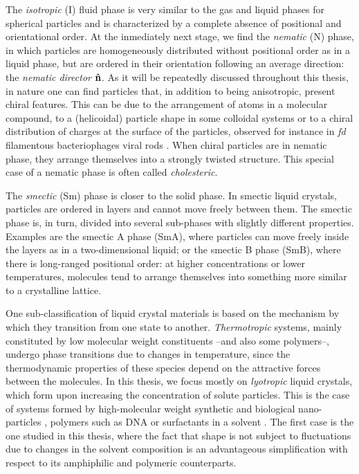 The {\em isotropic} (I) fluid phase is very similar to the gas and liquid phases for spherical particles and is characterized by a complete absence of positional and orientational order. At the inmediately next stage, we find the {\em nematic} (N) phase, in which particles are homogeneously distributed without positional order as in a liquid phase, but are ordered in their orientation following an average direction: the {\em nematic director} ${\bf \hat{n}}$. As it will be repeatedly discussed throughout this thesis, in nature one can find particles that, in addition to being anisotropic, present chiral features. This can be due to the arrangement of atoms in a molecular compound, to a (helicoidal) particle shape in some colloidal systems or to a chiral distribution of charges at the surface of the particles, observed for instance in {\em fd} filamentous bacteriophages viral rods \cite{Gibaud_2017}. When chiral particles are in nematic phase, they arrange themselves into a strongly twisted structure. This special case of a nematic phase is often called {\em cholesteric}.

The {\em smectic} (Sm) phase is closer to the solid phase. In smectic liquid crystals, particles are ordered in layers and cannot move freely between them. The smectic phase is, in turn, divided into several sub-phases with slightly different properties. Examples are the smectic A phase (SmA), where particles can move freely inside the layers as in a two-dimensional liquid; or the smectic B phase (SmB), where there is long-ranged positional order: at higher concentrations or lower temperatures, molecules tend to arrange themselves into something more similar to a crystalline lattice.

One sub-classification of liquid crystal materials is based on the mechanism by which they transition from one state to another. {\em Thermotropic} systems, mainly constituted by low molecular weight constituents --and also some polymers--, undergo phase transitions due to changes in temperature, since the thermodynamic properties of these species depend on the attractive forces between the molecules. In this thesis, we focus mostly on  {\em lyotropic} liquid crystals, which form upon increasing the concentration of solute particles. This is the case of systems formed by high-molecular weight synthetic and biological nano-particles \cite{sonin1998inorganic,dogic-fraden_fil}, polymers such as DNA \cite{livolantDNAoverview} or surfactants in a solvent \cite{fontell1981}. The first case is the one studied in this thesis, where the fact that shape is not subject to fluctuations due to changes in the solvent composition is an advantageous simplification with respect to its amphiphilic and polymeric counterparts.

